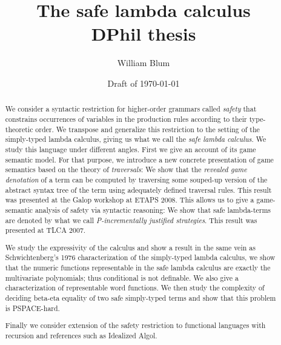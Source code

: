 


\makeindex



\author{William Blum}
\title{The safe lambda calculus  \\{\small DPhil thesis}}
\renewcommand{\crest}{\beltcrest}

\date{Draft of \today}

\setcounter{secnumdepth}{3}
\setcounter{tocdepth}{3}


\maketitle

\begin{abstract}
We consider a syntactic restriction for higher-order grammars called \emph{safety}  that  constrains occurrences of variables in the production rules according to their type-theoretic order. We transpose and generalize this restriction to the setting of the simply-typed lambda calculus, giving us what we call the \emph{safe lambda calculus}. We study this language under different angles. First we give an account of its game semantic model. For that purpose, we introduce a new concrete presentation of game semantics based on the theory of \emph{traversals}: We show that the \emph{revealed game denotation} of a term can be computed by traversing some souped-up version of the abstract syntax tree of the term using adequately defined traversal rules. This result was presented at the Galop workshop at ETAPS 2008. This allows us to give a game-semantic analysis of safety via syntactic reasoning: We show that  safe lambda-terms are denoted by what we call \emph{P-incrementally justified strategies}. This result was presented at TLCA 2007.

We study the expressivity of the calculus and show a result in the
same vein as Schwichtenberg's 1976 characterization of the
simply-typed lambda calculus, we show that the numeric functions
representable in the safe lambda calculus are exactly the
multivariate polynomials; thus conditional is not definable. We
also give a characterization of representable word functions.
We then study the complexity of deciding beta-eta equality of two safe simply-typed terms and show that this problem is PSPACE-hard.

Finally we consider extension of the safety restriction to functional languages with recursion and references such as Idealized Algol.

\end{abstract}

